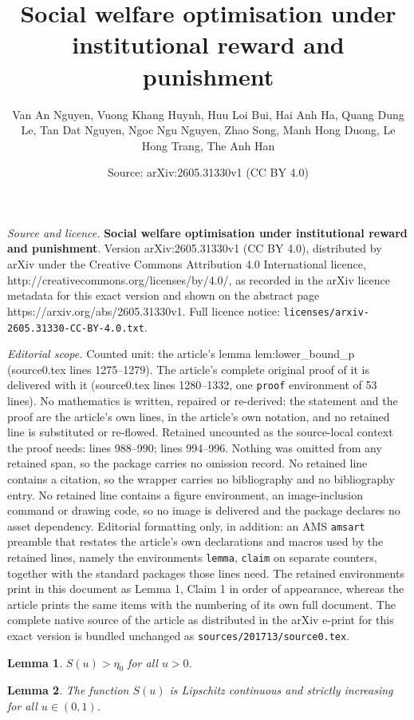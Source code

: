 \documentclass[10pt,a4paper]{amsart}
\title{\textbf{Social welfare optimisation under institutional reward and punishment}}
\author{Van An Nguyen, Vuong Khang Huynh, Huu Loi Bui, Hai Anh Ha, Quang Dung Le, Tan Dat Nguyen, Ngoc Ngu Nguyen, Zhao Song, Manh Hong Duong, Le Hong Trang, The Anh Han}
\date{Source: arXiv:2605.31330v1 (CC BY 4.0)}
\newtheorem{lemma}{Lemma}
\begin{document}
\maketitle

\noindent\emph{Source and licence.} \textbf{Social welfare optimisation under institutional reward and punishment}. Version arXiv:2605.31330v1 (CC BY 4.0), distributed by arXiv under the Creative Commons Attribution 4.0 International licence, http://creativecommons.org/licenses/by/4.0/, as recorded in the arXiv licence metadata for this exact version and shown on the abstract page https://arxiv.org/abs/2605.31330v1. Full licence notice: \texttt{licenses/arxiv-2605.31330-CC-BY-4.0.txt}.\par\smallskip

\noindent\textit{Editorial scope.} Counted unit: the article's lemma lem:lower\_bound\_p (source0.tex lines 1275--1279). The article's complete original proof of it is delivered with it (source0.tex lines 1280--1332, one \texttt{proof} environment of 53 lines). No mathematics is written, repaired or re-derived: the statement and the proof are the article's own lines, in the article's own notation, and no retained line is substituted or re-flowed.  Retained uncounted as the source-local context the proof needs: lines 988--990; lines 994--996.  Nothing was omitted from any retained span, so the package carries no omission record.  No retained line contains a citation, so the wrapper carries no bibliography and no bibliography entry.  No retained line contains a figure environment, an image-inclusion command or drawing code, so no image is delivered and the package declares no asset dependency.  Editorial formatting only, in addition: an AMS \texttt{amsart} preamble that restates the article's own declarations and macros used by the retained lines, namely the environments \texttt{lemma}, \texttt{claim} on separate counters, together with the standard packages those lines need.  The retained environments print in this document as Lemma 1, Claim 1 in order of appearance, whereas the article prints the same items with the numbering of its own full document.  The complete native source of the article as distributed in the arXiv e-print for this exact version is bundled unchanged as \texttt{sources/201713/source0.tex}.
\begin{lemma} \label{obs_eta0}
$S(u) > \eta_0$ for all $u > 0$.
\end{lemma}

\begin{lemma} \label{obs_lipschitz}
The function $S(u)$ is Lipschitz continuous and strictly increasing for all $u \in (0, 1)$.
\end{lemma}
\end{document}
